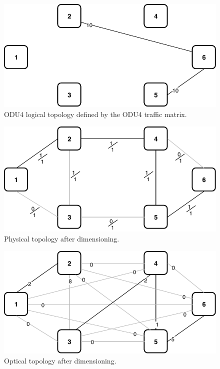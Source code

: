 \begin{figure}[h!]
\centering
\includegraphics[width=12cm]{sdf/ilp/translucent_survivability/figures/logical_topology_ODU4_medium}
\caption{ODU4 logical topology defined by the ODU4 traffic matrix.}
\label{logical3_ODU4_medium}
\end{figure}

\begin{figure}[h!]
\centering
\includegraphics[width=12cm]{sdf/ilp/translucent_survivability/figures/physical_topology}
\caption{Physical topology after dimensioning.}
\label{physical3_medium}
\end{figure}

\newpage
\begin{figure}[h!]
\centering
\includegraphics[width=13cm]{sdf/ilp/translucent_survivability/figures/optical_topology_medium}
\caption{Optical topology after dimensioning.}
\label{optical3_medium}
\end{figure}

